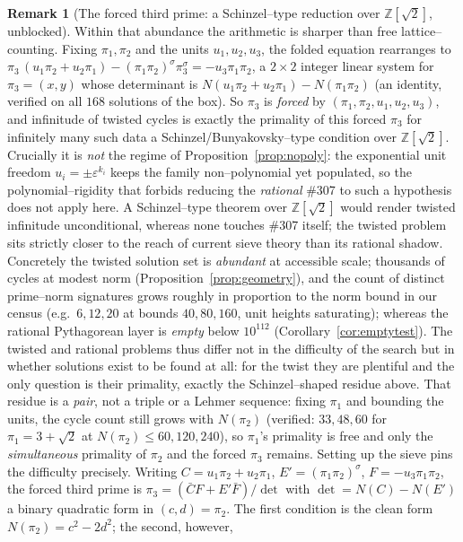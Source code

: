 \documentclass[11pt]{article}
\theoremstyle{definition}
\newtheorem{remark}[theorem]{Remark}
\begin{document}
\begin{remark}[{The forced third prime: a Schinzel--type reduction over $\mathbb{Z}[\sqrt2]$, unblocked}]
\label{rem:forced}
Within that abundance the arithmetic is sharper than free lattice--counting. Fixing $\pi_1,\pi_2$ and the
units $u_1,u_2,u_3$, the folded equation rearranges to
$\pi_3\,(u_1\pi_2+u_2\pi_1)-(\pi_1\pi_2)^\sigma\pi_3^\sigma=-u_3\pi_1\pi_2$, a $2\times2$ integer linear
system for $\pi_3=(x,y)$ whose determinant is $N(u_1\pi_2+u_2\pi_1)-N(\pi_1\pi_2)$ (an identity, verified
on all $168$ solutions of the box). So $\pi_3$ is \emph{forced} by $(\pi_1,\pi_2,u_1,u_2,u_3)$, and
infinitude of twisted cycles is exactly the primality of this forced $\pi_3$ for infinitely many such data
a Schinzel/Bunyakovsky--type condition over $\mathbb{Z}[\sqrt2]$. Crucially it is \emph{not} the regime
of Proposition~\ref{prop:nopoly}: the exponential unit freedom $u_i=\pm\varepsilon^{k_i}$ keeps the family
non--polynomial yet populated, so the polynomial--rigidity that forbids reducing the \emph{rational} \#307
to such a hypothesis does not apply here. A Schinzel--type theorem over $\mathbb{Z}[\sqrt2]$ would render
twisted infinitude unconditional, whereas none touches \#307 itself; the twisted problem sits strictly
closer to the reach of current sieve theory than its rational shadow. Concretely the twisted solution set
is \emph{abundant} at accessible scale; thousands of cycles at modest norm (Proposition~\ref{prop:geometry}),
and the count of distinct prime--norm signatures grows roughly in proportion to the norm bound in our census
(e.g.\ $6,12,20$ at bounds $40,80,160$, unit heights saturating); whereas the rational Pythagorean layer
is \emph{empty} below $10^{112}$ (Corollary~\ref{cor:emptytest}). The twisted and rational problems thus differ
not in the difficulty of the search but in whether solutions exist to be found at all: for the twist they are
plentiful and the only question is their primality, exactly the Schinzel--shaped residue above. That residue is a
\emph{pair}, not a triple or a Lehmer sequence: fixing $\pi_1$ and bounding the units, the cycle count still
grows with $N(\pi_2)$ (verified: $33,48,60$ for $\pi_1=3+\sqrt2$ at $N(\pi_2)\le60,120,240$), so $\pi_1$'s
primality is free and only the \emph{simultaneous} primality of $\pi_2$ and the forced $\pi_3$ remains. Setting up
the sieve pins the difficulty precisely. Writing $C=u_1\pi_2+u_2\pi_1$, $E'=(\pi_1\pi_2)^\sigma$,
$F=-u_3\pi_1\pi_2$, the forced third prime is $\pi_3=(\bar CF+E'\bar F)/\det$ with $\det=N(C)-N(E')$ a binary
quadratic form in $(c,d)=\pi_2$. The first condition is the clean form $N(\pi_2)=c^2-2d^2$; the second, however,

\end{remark}
\end{document}
